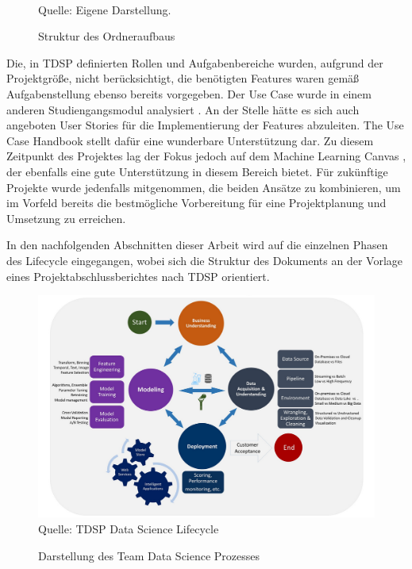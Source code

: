 \begin{figure}[h]
\caption{Struktur des Ordneraufbaus}
\begin{tabular}{c}  

\end{tabular}\\
\centering
Quelle: Eigene Darstellung.
\label{tab:structure}
\end{figure}

\FloatBarrier

Die, in TDSP definierten Rollen und Aufgabenbereiche wurden, aufgrund der Projektgröße, nicht berücksichtigt, die benötigten Features waren gemäß Aufgabenstellung ebenso bereits vorgegeben. Der Use Case wurde in einem anderen Studiengangsmodul analysiert \citep{grunsky_rettungsdienst_2024}. An der Stelle hätte es sich auch angeboten User Stories für die Implementierung der Features abzuleiten. The Use Case Handbook \citep{microtool_gmbh_use_2017} stellt dafür eine wunderbare Unterstützung dar. Zu diesem Zeitpunkt des Projektes lag der Fokus jedoch auf dem Machine Learning Canvas \citep{dorard_machine_2022}, der ebenfalls eine gute Unterstützung in diesem Bereich bietet. Für zukünftige Projekte wurde jedenfalls mitgenommen, die beiden Ansätze zu kombinieren, um im Vorfeld bereits die bestmögliche Vorbereitung für eine Projektplanung und Umsetzung zu erreichen.

In den nachfolgenden Abschnitten dieser Arbeit wird auf die einzelnen Phasen des Lifecycle eingegangen, wobei sich die Struktur des Dokuments an der Vorlage eines Projektabschlussberichtes nach TDSP orientiert. \citep{microsoft_azure_azure-tdsp-projecttemplatedocsprojectexit_2023}

\begin{figure}[h]
\centering
\caption{Darstellung des Team Data Science Prozesses}
\includegraphics[width=15cm]{01_resources/tdsp.png}\\
Quelle: TDSP Data Science Lifecycle \citep{microsoft_azure_tdsp_2017}
\label{fig:tdsp}
\end{figure}

